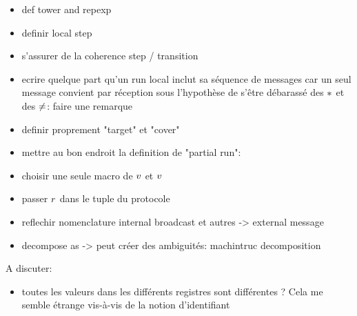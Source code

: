 \begin{itemize}
\item def tower and repexp
\item definir local step
\item s'assurer de la coherence step / transition
\item ecrire quelque part qu'un run local inclut sa séquence de messages car un seul message convient par réception sous l'hypothèse de s'être débarassé des ${*}$ et des ${\ne}$: faire une remarque \label{rem:local_transition_unique_message}
\item definir proprement "target" et "cover"
\item mettre au bon endroit la definition de "partial run": 
    \item choisir une seule macro de $v$ et $v$
    \item passer $r$ dans le tuple du protocole
    \item reflechir nomenclature internal broadcast et autres -> external message
    \item decompose as -> peut créer des ambiguités: machintruc decomposition 
\end{itemize}

A discuter:
\begin{itemize}
\item toutes les valeurs dans les différents registres sont différentes ? Cela me semble étrange vis-à-vis de la notion d'identifiant


\end{itemize}
